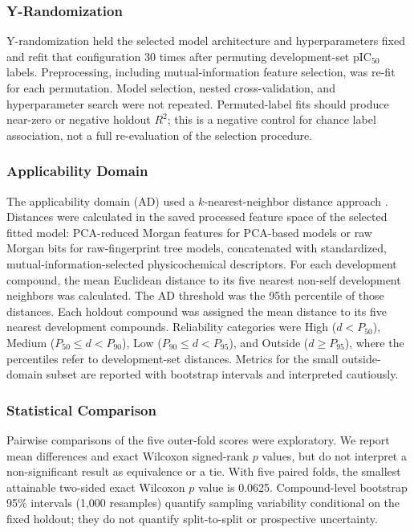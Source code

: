 \documentclass[11pt]{article}
\begin{document}
\subsubsection{Y-Randomization}

Y-randomization held the selected model architecture and hyperparameters fixed and
refit that configuration 30 times after permuting development-set pIC$_{50}$ labels.
Preprocessing, including mutual-information feature selection, was re-fit for each
permutation. Model selection, nested cross-validation, and hyperparameter search were
not repeated. Permuted-label fits should produce near-zero or negative holdout $R^2$;
this is a negative control for chance label association, not a full re-evaluation of
the selection procedure.

\subsubsection{Applicability Domain}

The applicability domain (AD) used a $k$-nearest-neighbor distance approach
\citep{oecd2007guidance}. Distances were calculated in the saved processed feature space
of the selected fitted model: PCA-reduced Morgan features for PCA-based models or raw
Morgan bits for raw-fingerprint tree models, concatenated with standardized,
mutual-information-selected physicochemical descriptors. For each
development compound, the mean Euclidean distance to its five nearest non-self
development neighbors was calculated. The AD threshold was the 95th percentile of those
distances. Each holdout compound was assigned the mean distance to its five nearest
development compounds. Reliability categories were High ($d<P_{50}$), Medium
($P_{50}\leq d<P_{90}$), Low ($P_{90}\leq d<P_{95}$), and Outside ($d\geq P_{95}$), where
the percentiles refer to development-set distances. Metrics for the small outside-domain
subset are reported with bootstrap intervals and interpreted cautiously.

\subsubsection{Statistical Comparison}

Pairwise comparisons of the five outer-fold scores were exploratory. We report mean
differences and exact Wilcoxon signed-rank $p$ values, but do not interpret a
non-significant result as equivalence or a tie. With five paired folds, the smallest
attainable two-sided exact Wilcoxon $p$ value is 0.0625. Compound-level bootstrap
95\% intervals (1,000 resamples) quantify sampling variability conditional on the fixed
holdout; they do not quantify split-to-split or prospective uncertainty.
\end{document}
